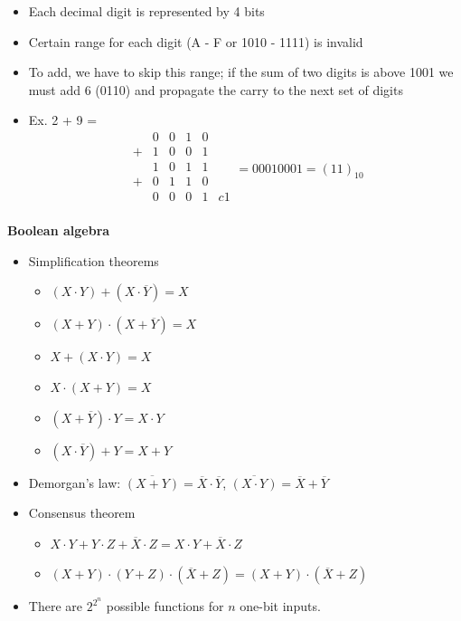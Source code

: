 \documentclass{article}
\begin{document}
\begin{itemize}
    \item Each decimal digit is represented by 4 bits
    \item Certain range for each digit (A - F or 1010 - 1111) is invalid
    \item To add, we have to skip this range; if the sum of two digits is above 1001 we must add 6 (0110) and propagate the carry to the next set of digits
    \item Ex. 2 + 9 =
    \begin{equation*}
        \begin{array}{cccccc}
            \phantom{ }  & 0 & 0 & 1 & 0 & \\
            + & 1 & 0 & 0 & 1 & \\
            \hline
            \phantom{ }  & 1 & 0 & 1 & 1 & \\
            + & 0 & 1 & 1 & 0 & \\
            \hline
            \phantom{ }  & 0 & 0 & 0 & 1 & c 1\\
        \end{array}
        = 0001 0001 = (11)_{10}
    \end{equation*}
\end{itemize}
\textbf{Boolean algebra}
\begin{itemize}
    \item Simplification theorems
    \begin{itemize}
        \item $(X \cdot Y) + (X \cdot \overline{Y}) = X$
        \item $(X + Y) \cdot (X + \overline{Y}) = X$
        \item $X + (X \cdot Y) = X$
        \item $X \cdot (X + Y) = X$
        \item $(X + \overline{Y}) \cdot Y = X \cdot Y$
        \item $(X \cdot \overline{Y}) + Y = X + Y$
    \end{itemize}
    \item Demorgan's law: $\overline{(X + Y)} = \overline{X} \cdot \overline{Y}$, $\overline{(X \cdot Y)} = \overline{X} + \overline{Y}$
    \item Consensus theorem
    \begin{itemize}
        \item $X \cdot Y + Y \cdot Z + \overline{X} \cdot Z = X \cdot Y + \overline{X} \cdot Z$
        \item $(X + Y) \cdot (Y + Z) \cdot (\overline{X} + Z) = (X + Y) \cdot (\overline{X} + Z)$
    \end{itemize}
    \item There are $2^{2^n}$ possible functions for $n$ one-bit inputs.
\end{itemize}
\end{document}
